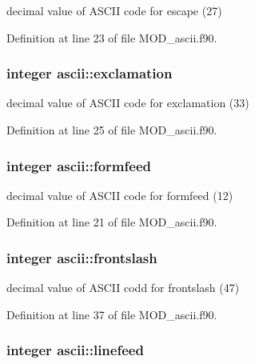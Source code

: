 decimal value of A\-S\-C\-I\-I code for escape (27) 



Definition at line 23 of file M\-O\-D\-\_\-ascii.\-f90.

\hypertarget{classascii_af5fe9f0207e37c108e594174a79f65c1}{
\subsubsection[{exclamation}]{\setlength{\rightskip}{0pt plus 5cm}integer ascii\-::exclamation}}\label{classascii_af5fe9f0207e37c108e594174a79f65c1}


decimal value of A\-S\-C\-I\-I code for exclamation (33) 



Definition at line 25 of file M\-O\-D\-\_\-ascii.\-f90.

\hypertarget{classascii_a655608979ecc63dc06baa68488367c40}{
\subsubsection[{formfeed}]{\setlength{\rightskip}{0pt plus 5cm}integer ascii\-::formfeed}}\label{classascii_a655608979ecc63dc06baa68488367c40}


decimal value of A\-S\-C\-I\-I code for formfeed (12) 



Definition at line 21 of file M\-O\-D\-\_\-ascii.\-f90.

\hypertarget{classascii_a78468f8ef6c28184ae59b14281466259}{
\subsubsection[{frontslash}]{\setlength{\rightskip}{0pt plus 5cm}integer ascii\-::frontslash}}\label{classascii_a78468f8ef6c28184ae59b14281466259}


decimal value of A\-S\-C\-I\-I codd for frontslash (47) 



Definition at line 37 of file M\-O\-D\-\_\-ascii.\-f90.

\hypertarget{classascii_a949aa8b3830c32eef91dfc2cf29f592b}{
\subsubsection[{linefeed}]{\setlength{\rightskip}{0pt plus 5cm}integer ascii\-::linefeed}}\label{classascii_a949aa8b3830c32eef91dfc2cf29f592b}


